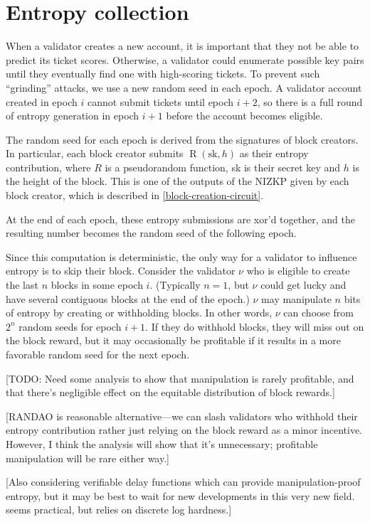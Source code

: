 \section{Entropy collection}
\label{entropy}

When a validator creates a new account, it is important that they not be able to predict its ticket scores. Otherwise, a validator could enumerate possible key pairs until they eventually find one with high-scoring tickets. To prevent such ``grinding'' attacks, we use a new random seed in each epoch. A validator account created in epoch $i$ cannot submit tickets until epoch $i + 2$, so there is a full round of entropy generation in epoch $i + 1$ before the account becomes eligible.

The random seed for each epoch is derived from the signatures of block creators. In particular, each block creator submits $\operatorname{R}(\mathrm{sk}, h)$ as their entropy contribution, where $R$ is a pseudorandom function, sk is their secret key and $h$ is the height of the block. This is one of the outputs of the NIZKP given by each block creator, which is described in \autoref{block-creation-circuit}.

At the end of each epoch, these entropy submissions are xor'd together, and the resulting number becomes the random seed of the following epoch.

Since this computation is deterministic, the only way for a validator to influence entropy is to skip their block. Consider the validator $\nu$ who is eligible to create the last $n$ blocks in some epoch $i$. (Typically $n = 1$, but $\nu$ could get lucky and have several contiguous blocks at the end of the epoch.) $\nu$ may manipulate $n$ bits of entropy by creating or withholding blocks. In other words, $\nu$ can choose from $2^n$ random seeds for epoch $i + 1$. If they do withhold blocks, they will miss out on the block reward, but it may occasionally be profitable if it results in a more favorable random seed for the next epoch.

[TODO: Need some analysis to show that manipulation is rarely profitable, and that there's negligible effect on the equitable distribution of block rewards.]

[RANDAO is reasonable alternative---we can slash validators who withhold their entropy contribution rather just relying on the block reward as a minor incentive. However, I think the analysis will show that it's unnecessary; profitable manipulation will be rare either way.]

[Also considering verifiable delay functions which can provide manipulation-proof entropy, but it may be best to wait for new developments in this very new field. \cite{wesolowski2018slow} seems practical, but relies on discrete log hardness.]
